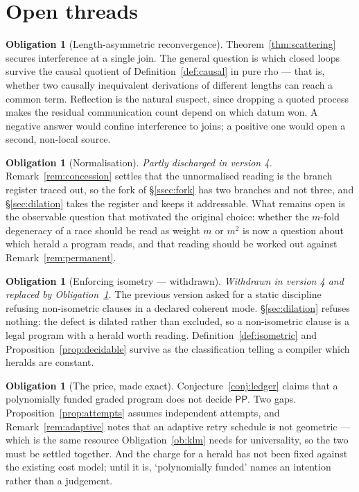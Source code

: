 \documentclass[11pt,a4paper]{article}
\theoremstyle{plain}
\theoremstyle{definition}
\newtheorem{obligation}[theorem]{Obligation}
\theoremstyle{remark}
\begin{document}
\section{Open threads}\label{sec:open}

\begin{obligation}[Length-asymmetric reconvergence]\label{ob:asym}
Theorem~\ref{thm:scattering} secures interference at a single join. The general
question is which closed loops survive the causal quotient of
Definition~\ref{def:causal} in pure rho --- that is, whether two causally
inequivalent derivations of different lengths can reach a common term. Reflection
is the natural suspect, since dropping a quoted process makes the residual
communication count depend on which datum won. A negative answer would confine
interference to joins; a positive one would open a second, non-local source.
\end{obligation}

\begin{obligation}[Normalisation]\label{ob:norm}
\emph{Partly discharged in version 4.} Remark~\ref{rem:concession} settles that
the unnormalised reading is the branch register traced out, so the fork of
\S\ref{ssec:fork} has two branches and not three, and
\S\ref{sec:dilation} takes the register and keeps it addressable. What remains
open is the observable question that motivated the original choice: whether the
$m$-fold degeneracy of a race should be read as weight $m$ or $m^2$ is now a
question about which herald a program reads, and that reading should be worked
out against Remark~\ref{rem:permanent}.
\end{obligation}

\begin{obligation}[Enforcing isometry --- withdrawn]\label{ob:unitary}
\emph{Withdrawn in version 4 and replaced by
Obligation~\ref{ob:price}.} The previous version asked for a static discipline
refusing non-isometric clauses in a declared coherent mode.
\S\ref{sec:dilation} refuses nothing: the defect is dilated rather than
excluded, so a non-isometric clause is a legal program with a herald worth
reading. Definition~\ref{def:isometric} and
Proposition~\ref{prop:decidable} survive as the classification telling a
compiler which heralds are constant.
\end{obligation}

\begin{obligation}[The price, made exact]\label{ob:price}
Conjecture~\ref{conj:ledger} claims that a polynomially funded graded program
does not decide $\mathsf{PP}$. Two gaps. Proposition~\ref{prop:attempts} assumes
independent attempts, and Remark~\ref{rem:adaptive} notes that an adaptive retry
schedule is not geometric --- which is the same resource
Obligation~\ref{ob:klm} needs for universality, so the two must be settled
together. And the charge for a herald has not been fixed against the existing
cost model; until it is, `polynomially funded' names an intention rather than a
judgement.
\end{obligation}
\end{document}
